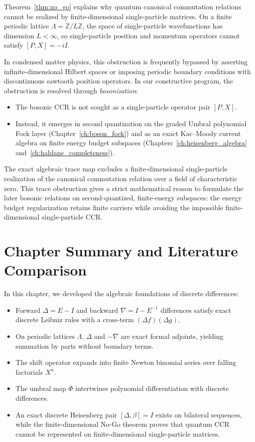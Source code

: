\begin{remark}
Theorem~\ref{thm:no_go} explains why quantum canonical commutation relations cannot be realized by finite-dimensional single-particle matrices. On a finite periodic lattice $\Lambda = \mathbb{Z}/L\mathbb{Z}$, the space of single-particle wavefunctions has dimension $L < \infty$, so single-particle position and momentum operators cannot satisfy $[P, X] = -i I$.

In condensed matter physics, this obstruction is frequently bypassed by asserting infinite-dimensional Hilbert spaces or imposing periodic boundary conditions with discontinuous sawtooth position operators. In our constructive program, the obstruction is resolved through \emph{bosonization}:
\begin{itemize}
    \item The bosonic CCR is not sought as a single-particle operator pair $[P, X]$.
    \item Instead, it emerges in second quantization on the graded Umbral polynomial Fock layer (Chapter~\ref{ch:boson_fock}) and as an exact Kac--Moody current algebra on finite energy budget subspaces (Chapters~\ref{ch:heisenberg_algebra} and~\ref{ch:haldane_completeness}).
\end{itemize}

The exact algebraic trace map excludes a finite-dimensional single-particle realization of the canonical commutation relation over a field of characteristic zero. This trace obstruction gives a strict mathematical reason to formulate the later bosonic relations on second-quantized, finite-energy subspaces: the energy budget regularization retains finite carriers while avoiding the impossible finite-dimensional single-particle CCR.
\end{remark}

\section{Chapter Summary and Literature Comparison}

In this chapter, we developed the algebraic foundations of discrete differences:
\begin{itemize}
    \item Forward $\Delta = E - I$ and backward $\nabla = I - E^{-1}$ differences satisfy exact discrete Leibniz rules with a cross-term $(\Delta f)(\Delta g)$.
    \item On periodic lattices $\Lambda$, $\Delta$ and $-\nabla$ are exact formal adjoints, yielding summation by parts without boundary terms.
    \item The shift operator expands into finite Newton binomial series over falling factorials $X^{\underline{n}}$.
    \item The umbral map $\Phi$ intertwines polynomial differentiation with discrete differences.
    \item An exact discrete Heisenberg pair $[\Delta, \beta] = I$ exists on bilateral sequences, while the finite-dimensional No-Go theorem proves that quantum CCR cannot be represented on finite-dimensional single-particle matrices.
\end{itemize}

